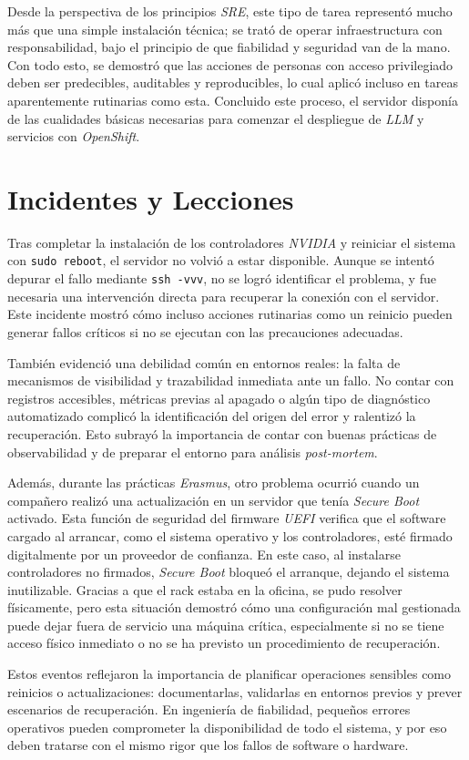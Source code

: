 Desde la perspectiva de los principios \textit{SRE}, este tipo de tarea representó mucho más que una simple instalación técnica; se trató de operar infraestructura con responsabilidad, bajo el principio de que fiabilidad y seguridad van de la mano. Con todo esto, se demostró que las acciones de personas con acceso privilegiado deben ser predecibles, auditables y reproducibles, lo cual aplicó incluso en tareas aparentemente rutinarias como esta. Concluido este proceso, el servidor disponía de las cualidades básicas necesarias para comenzar el despliegue de \textit{LLM} y servicios con \textit{OpenShift}.

\newpage
\section{Incidentes y Lecciones}
Tras completar la instalación de los controladores \textit{NVIDIA} y reiniciar el sistema con \texttt{sudo reboot}, el servidor no volvió a estar disponible. Aunque se intentó depurar el fallo mediante \texttt{ssh -vvv}, no se logró identificar el problema, y fue necesaria una intervención directa para recuperar la conexión con el servidor. Este incidente mostró cómo incluso acciones rutinarias como un reinicio pueden generar fallos críticos si no se ejecutan con las precauciones adecuadas.

También evidenció una debilidad común en entornos reales: la falta de mecanismos de visibilidad y trazabilidad inmediata ante un fallo. No contar con registros accesibles, métricas previas al apagado o algún tipo de diagnóstico automatizado complicó la identificación del origen del error y ralentizó la recuperación. Esto subrayó la importancia de contar con buenas prácticas de observabilidad y de preparar el entorno para análisis \textit{post-mortem}. %

Además, durante las prácticas \textit{Erasmus}, otro problema ocurrió cuando un compañero realizó una actualización en un servidor que tenía \textit{Secure Boot} activado. Esta función de seguridad del firmware \textit{UEFI} verifica que el software cargado al arrancar, como el sistema operativo y los controladores, esté firmado digitalmente por un proveedor de confianza. En este caso, al instalarse controladores no firmados, \textit{Secure Boot} bloqueó el arranque, dejando el sistema inutilizable. Gracias a que el rack estaba en la oficina, se pudo resolver físicamente, pero esta situación demostró cómo una configuración mal gestionada puede dejar fuera de servicio una máquina crítica, especialmente si no se tiene acceso físico inmediato o no se ha previsto un procedimiento de recuperación.

Estos eventos reflejaron la importancia de planificar operaciones sensibles como reinicios o actualizaciones: documentarlas, validarlas en entornos previos y prever escenarios de recuperación. En ingeniería de fiabilidad, pequeños errores operativos pueden comprometer la disponibilidad de todo el sistema, y por eso deben tratarse con el mismo rigor que los fallos de software o hardware.

